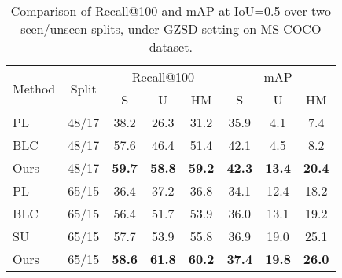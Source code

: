 \documentclass[10pt,twocolumn,letterpaper]{article}
\begin{document}
\begin{table}[t]
  \caption{Comparison of Recall@100 and mAP at IoU=0.5 over two seen/unseen splits, under GZSD setting on MS COCO dataset.}
\renewcommand\tabcolsep{4.4pt}
    \begin{tabular}{lccccccc}
    \toprule
    \multirow{2}[4]{*}{Method} & \multirow{2}[4]{*}{Split} & \multicolumn{3}{c}{Recall@100} & \multicolumn{3}{c}{mAP} \\
\cmidrule(r){3-5}     \cmidrule(r){6-8}   &       & S     & U     & HM    & S     & U     & HM \\
    \midrule
    PL \cite{rahman2020improved}   & 48/17 & 38.2     & 26.3     & 31.2     & 35.9     & 4.1     & 7.4 \\
    BLC \cite{zheng2020background}  & 48/17 & 57.6     & 46.4     & 51.4     & 42.1     & 4.5     & 8.2 \\
    Ours  & 48/17 & \textbf{59.7}     & \textbf{58.8}     & \textbf{59.2}     & \textbf{42.3}     & \textbf{13.4}     & \textbf{20.4} \\
    \midrule
    PL  \cite{rahman2020improved}  & 65/15 & 36.4     & 37.2     & 36.8     & 34.1     & 12.4     & 18.2 \\
    BLC \cite{zheng2020background}  & 65/15 & 56.4     & 51.7     & 53.9     & 36.0     & 13.1     & 19.2 \\
    SU \cite{hayat2020synthesizing}  & 65/15 & 57.7     & 53.9     & 55.8     & 36.9     & 19.0     & 25.1 \\
    Ours  & 65/15 & \textbf{58.6}    & \textbf{61.8}     & \textbf{60.2}     & \textbf{37.4}     & \textbf{19.8}     & \textbf{26.0} \\
    \bottomrule
    \end{tabular}\label{gzsd-coco}\end{table}
\end{document}
